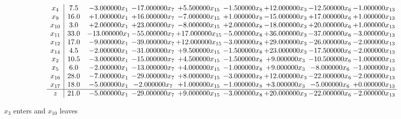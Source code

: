 \documentclass[10pt]{article}
\begin{document}
 \[\begin{array}{c| c c@{\hskip 2pt} c@{\hskip 2pt} c@{\hskip 2pt} c@{\hskip 2pt} c@{\hskip 2pt} c@{\hskip 2pt} c@{\hskip 2pt} }
 x_{4}   &  7.5 & -3.000000 x_{1} & -17.000000 x_{7} & + 5.500000 x_{15} & -1.500000 x_{8} & + 12.000000 x_{3} & -12.500000 x_{6} & -1.000000 x_{13}\\
 x_{9}   &  16.0 & + 1.000000 x_{1} & + 16.000000 x_{7} & -7.000000 x_{15} & + 1.000000 x_{8} & -15.000000 x_{3} & + 17.000000 x_{6} & + 1.000000 x_{13}\\
 x_{10}   &  3.0 & + 2.000000 x_{1} & + 23.000000 x_{7} & -8.000000 x_{15} & + 2.000000 x_{8} & -18.000000 x_{3} & + 20.000000 x_{6} & + 1.000000 x_{13}\\
 x_{11}   &  33.0 & -13.000000 x_{1} & -55.000000 x_{7} & + 17.000000 x_{15} & -5.000000 x_{8} & + 36.000000 x_{3} & -37.000000 x_{6} & -3.000000 x_{13}\\
 x_{12}   &  17.0 & -9.000000 x_{1} & -39.000000 x_{7} & + 12.000000 x_{15} & -3.000000 x_{8} & + 29.000000 x_{3} & -26.000000 x_{6} & -2.000000 x_{13}\\
 x_{14}   &  4.5 & -2.000000 x_{1} & -31.000000 x_{7} & + 9.500000 x_{15} & -1.500000 x_{8} & + 23.000000 x_{3} & -17.500000 x_{6} & -2.000000 x_{13}\\
 x_{2}   &  10.5 & -3.000000 x_{1} & -15.000000 x_{7} & + 4.500000 x_{15} & -1.500000 x_{8} & + 9.000000 x_{3} & -10.500000 x_{6} & -1.000000 x_{13}\\
 x_{5}   &  6.0 & -2.000000 x_{1} & -13.000000 x_{7} & + 4.000000 x_{15} & -1.000000 x_{8} & + 9.000000 x_{3} & -8.000000 x_{6} & -1.000000 x_{13}\\
 x_{16}   &  28.0 & -7.000000 x_{1} & -29.000000 x_{7} & + 8.000000 x_{15} & -3.000000 x_{8} & + 12.000000 x_{3} & -22.000000 x_{6} & -2.000000 x_{13}\\
 x_{17}   &  18.0 & -5.000000 x_{1} & -2.000000 x_{7} & + 1.000000 x_{15} & -1.000000 x_{8} & + 3.000000 x_{3} & -5.000000 x_{6} & + 0.000000 x_{13}\\
\hline
z    &  21.0 & -5.000000 x_{1} & -29.000000 x_{7} & + 9.000000 x_{15} & -3.000000 x_{8} & + 20.000000 x_{3} & -22.000000 x_{6} & -2.000000 x_{13}\\
\end{array}\]


 $ x_{3} $ enters and $ x_{10} $ leaves 
\end{document}

